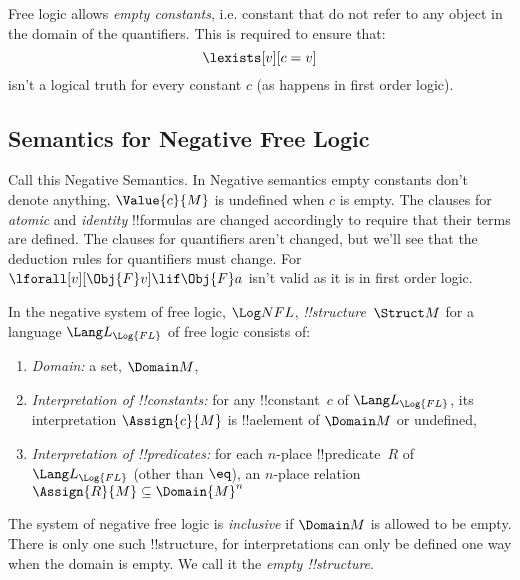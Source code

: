 \documentclass[../../../../include/open-logic-section]{subfiles}
\begin{document}


Free logic allows \emph{empty constants}, i.e. constant that do not refer to 
any object in the domain of the quantifiers. This is required 
to ensure that:
$$\lexists[v][c=v]$$ isn't a logical truth for every constant $c$ (as
happens in first order logic).

\subsection{Semantics for Negative Free Logic}

Call this Negative Semantics. In Negative semantics empty constants
don't denote anything. $\Value{c}{M}$ is undefined when $c$ is empty.
The clauses for \emph{atomic} and \emph{identity} !!{formula}s are
changed accordingly to require that their terms are defined. The
clauses for quantifiers aren't changed, but we'll see that the
deduction rules for quantifiers must change. For
$\lforall[v][\Obj{F}v]\lif \Obj{F}a$ isn't valid as it is in first
order logic. 


\begin{defn}[!!^{structure}s]
    In the negative system of free logic, $\Log NFL$,
     \emph{!!{structure}}~$\Struct M$ for a language
    $\Lang L_{\Log{FL}}$ of free logic consists of:
    \begin{enumerate}
    \item \emph{Domain:} a set, $\Domain M$,
    \item \emph{Interpretation of !!{constant}s:} for any !!{constant}~$c$ of
      $\Lang L_{\Log{FL}}$, its interpretation $\Assign{c}{M}$ is !!a{element} of 
      $\Domain M$ or undefined,
    \item \emph{Interpretation of !!{predicate}s:} for each $n$-place
      !!{predicate}~$R$ of $\Lang L_{\Log{FL}}$ (other than $\eq$), an $n$-place
      relation $\Assign{R}{M} \subseteq \Domain{M}^n$
    \end{enumerate}
    The system of negative free logic is \emph{inclusive} if $\Domain M$ is
    allowed to be empty. There is only one such !!{structure}, for interpretations
    can only be defined one way when the domain is empty. We call it the 
    \emph{empty !!{structure}}.
    \end{defn}
\end{document}
